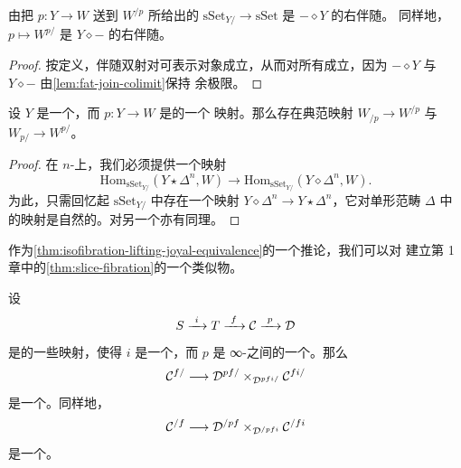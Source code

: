\begin{lemma}\label{lem:fat-slice-right-adjoint}
由把 $p\colon Y \to W$ 送到 $W^{/p}$ 所给出的\trFunctor{}%
$\mathrm{sSet}_{Y/} \to \mathrm{sSet}$ 是\trFunctor{} $- \diamond Y$ 的右伴随。
同样地，\trFunctor{} $p \mapsto W^{p/}$ 是\trFunctor{} $Y \diamond -$ 的右伴随。
\end{lemma}

\begin{proof}
按定义，伴随双射对可表示对象成立，从而对所有\trSimplicialSets{}成立，因为%
\trFunctor{} $- \diamond Y$ 与 $Y \diamond -$ 由\cref{lem:fat-join-colimit}保持
余极限。
\end{proof}

\begin{lemma}\label{lem:fat-slice-ordinary-map}
设 $Y$ 是一个\trSimplicialSet{}，而 $p\colon Y \to W$ 是\trSimplicialSets{}的一个
映射。那么存在典范映射 $W_{/p} \to W^{/p}$ 与 $W_{p/} \to W^{p/}$。
\end{lemma}

\begin{proof}
在 $n$-\trSimplex{}上，我们必须提供一个映射
\[
\mathrm{Hom}_{\mathrm{sSet}_{Y/}}(Y \star \Delta^n, W)
\longrightarrow
\mathrm{Hom}_{\mathrm{sSet}_{Y/}}(Y \diamond \Delta^n, W).
\]
为此，只需回忆起 $\mathrm{sSet}_{Y/}$ 中存在一个映射
$Y \diamond \Delta^n \to Y \star \Delta^n$，它对单形范畴 $\Delta$ 中的映射是自然的。对另一个\trSlice{}亦有同理。
\end{proof}

作为\cref{thm:isofibration-lifting-joyal-equivalence}的一个推论，我们可以对\trFatSlice{}%
建立第 1 章中的\cref{thm:slice-fibration}的一个类似物。

\begin{lemma}\label{lem:fat-slice-fibration}
设
\[
S \xrightarrow{\ i\ } T \xrightarrow{\ f\ } \mathcal{C} \xrightarrow{\ p\ } \mathcal{D}
\]
是\trSimplicialSets{}的一些映射，使得 $i$ 是一个\trMonomorphism{}，而 $p$ 是
∞-\trCategories{}之间的一个\trIsofibration{}。那么\trFunctor{}%
\[
\mathcal{C}^{f/} \longrightarrow \mathcal{D}^{pf/} \times_{\mathcal{D}^{pfi/}} \mathcal{C}^{fi/}
\]
是一个\trLeftFibration{}。同样地，\trFunctor{}%
\[
\mathcal{C}^{/f} \longrightarrow \mathcal{D}^{/pf} \times_{\mathcal{D}^{/pfi}} \mathcal{C}^{/fi}
\]
是一个\trRightFibration{}。
\end{lemma}

